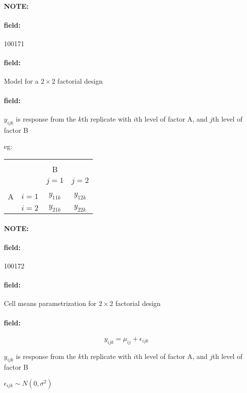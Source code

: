 \documentclass[12pt]{article}
\newenvironment{note}{\paragraph{NOTE:}}{}
\newenvironment{field}{\paragraph{field:}}{}
\begin{document}
\begin{note}
 \begin{field}
  \tiny 100171
 \end{field}
 \begin{field}
  Model for a $2\times 2$ factorial design
 \end{field}
 \begin{field}
  $y_{ijk}$ is response from the $k$th replicate with $i$th level of factor A, and $j$th level of factor B


  eg:

  \begin{center}
   \begin{tabular}{|c|c|c|c|}
    \hline                              \\
      &         & B         &           \\
      &         & $j=1$     & $j = 2$   \\
    \hline                              \\
    A & $i = 1$ & $y_{11k}$ & $y_{12k}$ \\
      & $i=2$   & $y_{21k}$ & $y_{22k}$ \\
    \hline
   \end{tabular}
  \end{center}
 \end{field}
\end{note}


\begin{note}
 \begin{field}
  \tiny 100172
 \end{field}
 \begin{field}
  Cell means parametrization for $2 \times 2$ factorial design
 \end{field}
 \begin{field}
  $$y_{ijk} = \mu_{ij} + \epsilon_{ijk}$$



  $y_{ijk}$ is response from the $k$th replicate with $i$th level of factor A, and $j$th level of factor B

  $\epsilon_{ijk} \sim N(0,\sigma^2)$
 \end{field}
\end{note}
\end{document}
